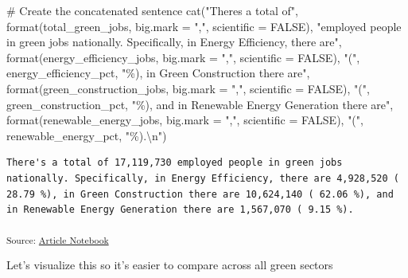 \documentclass[
  letterpaper,
  DIV=11,
  numbers=noendperiod]{scrartcl}
\newenvironment{Shaded}{\begin{snugshade}}{\end{snugshade}}
\newcommand{\AttributeTok}[1]{\textcolor[rgb]{0.40,0.45,0.13}{#1}}
\newcommand{\CommentTok}[1]{\textcolor[rgb]{0.37,0.37,0.37}{#1}}
\newcommand{\ConstantTok}[1]{\textcolor[rgb]{0.56,0.35,0.01}{#1}}
\newcommand{\FunctionTok}[1]{\textcolor[rgb]{0.28,0.35,0.67}{#1}}
\newcommand{\NormalTok}[1]{\textcolor[rgb]{0.00,0.23,0.31}{#1}}
\newcommand{\SpecialCharTok}[1]{\textcolor[rgb]{0.37,0.37,0.37}{#1}}
\newcommand{\StringTok}[1]{\textcolor[rgb]{0.13,0.47,0.30}{#1}}
\begin{document}
\begin{Shaded}
\begin{Highlighting}[]
\CommentTok{\# Create the concatenated sentence}
\FunctionTok{cat}\NormalTok{(}\StringTok{"There\textquotesingle{}s a total of"}\NormalTok{, }\FunctionTok{format}\NormalTok{(total\_green\_jobs, }\AttributeTok{big.mark =} \StringTok{","}\NormalTok{, }\AttributeTok{scientific =} \ConstantTok{FALSE}\NormalTok{), }
    \StringTok{"employed people in green jobs nationally. Specifically, in Energy Efficiency, there are"}\NormalTok{, }
    \FunctionTok{format}\NormalTok{(energy\_efficiency\_jobs, }\AttributeTok{big.mark =} \StringTok{","}\NormalTok{, }\AttributeTok{scientific =} \ConstantTok{FALSE}\NormalTok{), }
    \StringTok{"("}\NormalTok{, energy\_efficiency\_pct, }\StringTok{"\%), in Green Construction there are"}\NormalTok{, }
    \FunctionTok{format}\NormalTok{(green\_construction\_jobs, }\AttributeTok{big.mark =} \StringTok{","}\NormalTok{, }\AttributeTok{scientific =} \ConstantTok{FALSE}\NormalTok{), }
    \StringTok{"("}\NormalTok{, green\_construction\_pct, }\StringTok{"\%), and in Renewable Energy Generation there are"}\NormalTok{, }
    \FunctionTok{format}\NormalTok{(renewable\_energy\_jobs, }\AttributeTok{big.mark =} \StringTok{","}\NormalTok{, }\AttributeTok{scientific =} \ConstantTok{FALSE}\NormalTok{), }
    \StringTok{"("}\NormalTok{, renewable\_energy\_pct, }\StringTok{"\%).}\SpecialCharTok{\textbackslash{}n}\StringTok{"}\NormalTok{)}
\end{Highlighting}
\end{Shaded}

\begin{verbatim}
There's a total of 17,119,730 employed people in green jobs nationally. Specifically, in Energy Efficiency, there are 4,928,520 ( 28.79 %), in Green Construction there are 10,624,140 ( 62.06 %), and in Renewable Energy Generation there are 1,567,070 ( 9.15 %).
\end{verbatim}

\textsubscript{Source:
\href{https://beeckcenter.github.io/climate-equity-workforce/index-preview.html}{Article
Notebook}}

Let's visualize this so it's easier to compare across all green sectors
\end{document}

